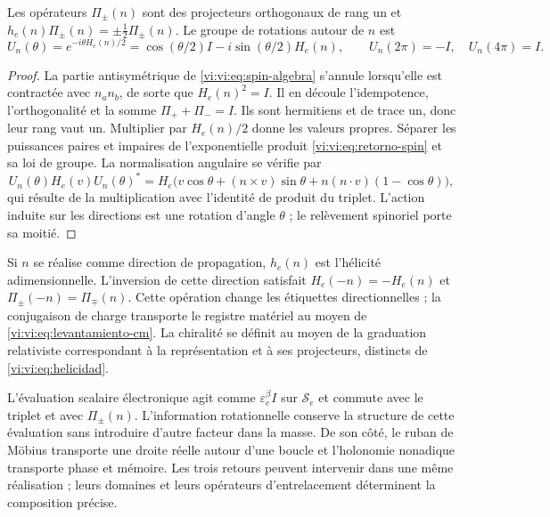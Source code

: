 \begin{proposition}
\label{vi:vi:prop:helicidad}
Les opérateurs $\Pi_\pm(n)$ sont des projecteurs orthogonaux de
rang un et $h_e(n)\Pi_\pm(n)=\pm\tfrac12\Pi_\pm(n)$.
Le groupe de rotations autour de $n$ est
\begin{equation}
 U_n(\theta)=e^{-i\theta H_e(n)/2}
 =\cos(\theta/2)I-i\sin(\theta/2)H_e(n),\qquad
 U_n(2\pi)=-I,\quad U_n(4\pi)=I.
 \label{vi:vi:eq:retorno-spin}
\end{equation}
\end{proposition}
\begin{proof}
La partie antisymétrique de \eqref{vi:vi:eq:spin-algebra} s’annule
lorsqu’elle est contractée avec $n_an_b$, de sorte que $H_e(n)^2=I$.
Il en découle l’idempotence, l’orthogonalité et la somme
$\Pi_++\Pi_-=I$. Ils sont hermitiens et de trace un, donc leur
rang vaut un. Multiplier par $H_e(n)/2$ donne les valeurs propres.
Séparer les puissances paires et impaires de l’exponentielle produit
\eqref{vi:vi:eq:retorno-spin} et sa loi de groupe. La normalisation
angulaire se vérifie par
\[
 U_n(\theta)H_e(v)U_n(\theta)^*
 =H_e\bigl(v\cos\theta+(n\times v)\sin\theta
       +n(n\cdot v)(1-\cos\theta)\bigr),
\]
qui résulte de la multiplication avec l’identité de produit du
triplet. L’action induite sur les directions est une rotation
d’angle $\theta$ ; le relèvement spinoriel porte sa moitié.
\end{proof}

Si $n$ se réalise comme direction de propagation, $h_e(n)$ est
l’hélicité adimensionnelle. L’inversion de cette direction satisfait
$H_e(-n)=-H_e(n)$ et $\Pi_\pm(-n)=\Pi_\mp(n)$.
Cette opération change les étiquettes directionnelles ; la conjugaison
de charge transporte le registre matériel au moyen de
\eqref{vi:vi:eq:levantamiento-cm}. La chiralité se définit au moyen de
la graduation relativiste correspondant à la représentation et à
ses projecteurs, distincts de \eqref{vi:vi:eq:helicidad}.

L’évaluation scalaire électronique agit comme
$\varepsilon_e^\beta I$ sur $\mathscr S_e$ et commute avec
le triplet et avec $\Pi_\pm(n)$. L’information rotationnelle conserve
la structure de cette évaluation sans introduire d’autre facteur dans
la masse. De son côté, le ruban de Möbius transporte une droite
réelle autour d’une boucle et l’holonomie nonadique transporte
phase et mémoire. Les trois retours peuvent intervenir dans une
même réalisation ; leurs domaines et leurs opérateurs d’entrelacement déterminent la
composition précise.
